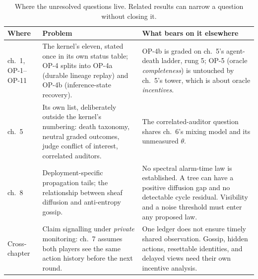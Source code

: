 \begin{table}[H]
\centering
\caption{Where the unresolved questions live. Related results can narrow a
question without closing it.}
\label{tab:op-concordance}
\small
\begin{tabularx}{\textwidth}{@{}>{\raggedright\arraybackslash}p{} >{\raggedright\arraybackslash}p{} >{\raggedright\arraybackslash}X@{}}
\toprule
\textbf{Where} & \textbf{Problem} & \textbf{What bears on it elsewhere} \\
\midrule
ch.~1, \textsf{OP-1}--\textsf{OP-11} & The kernel's eleven, stated once in its own status table; \textsf{OP-4} splits into \textsf{OP-4a} (durable lineage replay) and \textsf{OP-4b} (inference-state recovery). & \textsf{OP-4b} is graded on ch.~5's agent-death ladder, rung 5; \textsf{OP-5} (oracle \emph{completeness}) is untouched by ch.~5's tower, which is about oracle \emph{incentives}. \\
ch.~5 & Its own list, deliberately outside the kernel's numbering: death taxonomy, neutral graded outcomes, judge conflict of interest, correlated auditors. & The correlated-auditor question shares ch.~6's mixing model and its unmeasured $\theta$. \\
ch.~8 & Deployment-specific propagation tails; the relationship between sheaf diffusion and anti-entropy gossip. & No spectral alarm-time law is established. A tree can have a positive diffusion gap and no detectable cycle residual. Visibility and a noise threshold must enter any proposed law. \\
Cross-chapter & Claim signalling under \emph{private} monitoring: ch.~7 assumes both players see the same action history before the next round. & One ledger does not ensure timely shared observation. Gossip, hidden actions, resettable identities, and delayed views need their own incentive analysis. \\
\bottomrule
\end{tabularx}
\end{table}

\ifdefined\pdEnableMarginCitations\else
  \clearpage
\fi

\clearpage
{}
\clearpage
